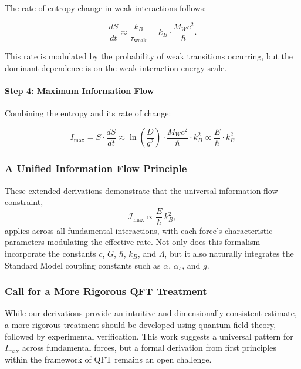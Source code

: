 \documentclass[12pt]{article}
\begin{document}
The rate of entropy change in weak interactions follows:

\begin{equation}
    \frac{dS}{dt} \approx \frac{k_B}{\tau_{\text{weak}}} = k_B \cdot \frac{M_W c^2}{\hbar}.
\end{equation}

This rate is modulated by the probability of weak transitions occurring, but the dominant dependence is on the weak interaction energy scale.

\paragraph{Step 4: Maximum Information Flow}

Combining the entropy and its rate of change:

\begin{equation}
    I_{\max} = S \cdot \frac{dS}{dt} \approx \ln\left(\frac{D}{g^2}\right) \cdot \frac{M_W c^2}{\hbar} \cdot k_B^2 \propto \frac{E}{\hbar} \cdot k_B^2
\end{equation}

\subsubsection{A Unified Information Flow Principle}

These extended derivations demonstrate that the universal information flow constraint,
\[
\mathcal{I}_{\max} \propto \frac{E}{\hbar}\, k_B^2,
\]
applies across all fundamental interactions, with each force’s characteristic parameters modulating the effective rate. Not only does this formalism incorporate the constants \(c\), \(G\), \(\hbar\), \(k_B\), and \(\Lambda\), but it also naturally integrates the Standard Model coupling constants such as \(\alpha\), \(\alpha_s\), and \(g\).

\subsubsection{Call for a More Rigorous QFT Treatment}

While our derivations provide an intuitive and dimensionally consistent estimate, a more rigorous treatment should be developed using quantum field theory, followed by experimental verification. This work suggests a universal pattern for $I_{\max}$ across fundamental forces, but a formal derivation from first principles within the framework of QFT remains an open challenge.
\end{document}
